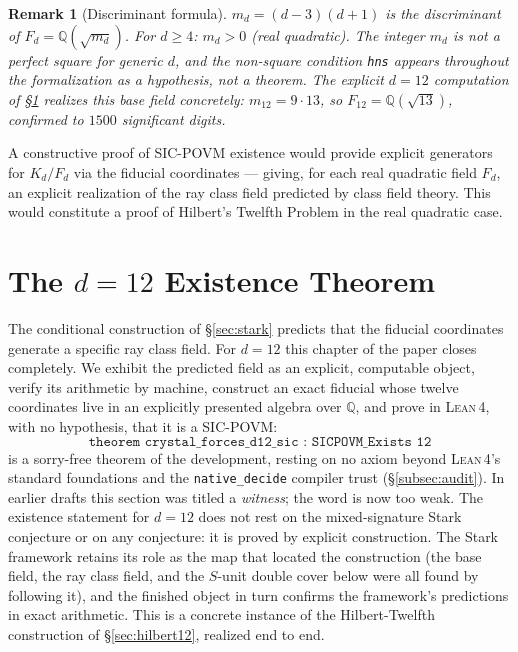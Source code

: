 \documentclass[12pt,a4paper]{article}
\newtheorem{remark}[theorem]{Remark}
\newcommand{\Kd}{K_d}
\newcommand{\Lean}{\textsc{Lean\,4}}
\begin{document}
\begin{remark}[Discriminant formula]
$m_d = (d-3)(d+1)$ is the discriminant of $F_d = \mathbb{Q}(\sqrt{m_d})$.  For
$d \geq 4$: $m_d > 0$ (real quadratic).  The integer $m_d$ is not a perfect
square for generic $d$, and the non-square condition \texttt{hns} appears
throughout the formalization as a hypothesis, not a theorem.  The explicit
$d=12$ computation of \S\ref{sec:d12} realizes this base field concretely:
$m_{12} = 9\cdot 13$, so $F_{12} = \mathbb{Q}(\sqrt{13})$, confirmed to $1500$
significant digits.
\end{remark}

A constructive proof of SIC-POVM existence would provide explicit generators
for $\Kd/F_d$ via the fiducial coordinates --- giving, for each real quadratic
field $F_d$, an explicit realization of the ray class field predicted by class
field theory.  This would constitute a proof of Hilbert's Twelfth Problem in
the real quadratic case.

\section{The \texorpdfstring{$d=12$}{d=12} Existence Theorem}
\label{sec:d12}

The conditional construction of \S\ref{sec:stark} predicts that the fiducial
coordinates generate a specific ray class field.  For $d=12$ this chapter of
the paper closes completely.  We exhibit the predicted field as an explicit,
computable object, verify its arithmetic by machine, construct an exact
fiducial whose twelve coordinates live in an explicitly presented algebra
over $\mathbb{Q}$, and prove in \Lean{}, with no hypothesis, that it is a
SIC-POVM:
\[
\texttt{theorem crystal\_forces\_d12\_sic : SICPOVM\_Exists 12}
\]
is a sorry-free theorem of the development, resting on no axiom beyond
\Lean{}'s standard foundations and the \texttt{native\_decide} compiler
trust (\S\ref{subsec:audit}).  In earlier drafts this section was titled a
\emph{witness}; the word is now too weak.  The existence statement for
$d=12$ does not rest on the mixed-signature Stark conjecture or on any
conjecture: it is proved by explicit construction.  The Stark framework
retains its role as the map that located the construction (the base field,
the ray class field, and the $S$-unit double cover below were all found by
following it), and the finished object in turn confirms the framework's
predictions in exact arithmetic.  This is a concrete instance of the
Hilbert-Twelfth construction of \S\ref{sec:hilbert12}, realized end to end.
\end{document}

